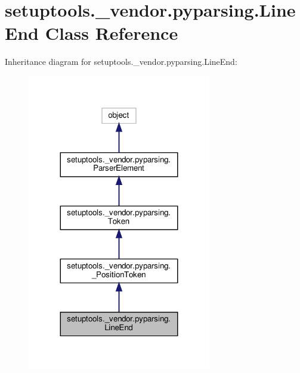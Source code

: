 \hypertarget{classsetuptools_1_1__vendor_1_1pyparsing_1_1LineEnd}{}\section{setuptools.\+\_\+vendor.\+pyparsing.\+Line\+End Class Reference}
\label{classsetuptools_1_1__vendor_1_1pyparsing_1_1LineEnd}


Inheritance diagram for setuptools.\+\_\+vendor.\+pyparsing.\+Line\+End\+:
\nopagebreak
\begin{figure}[H]
\begin{center}
\leavevmode
\includegraphics[width=227pt]{classsetuptools_1_1__vendor_1_1pyparsing_1_1LineEnd__inherit__graph}
\end{center}
\end{figure}


